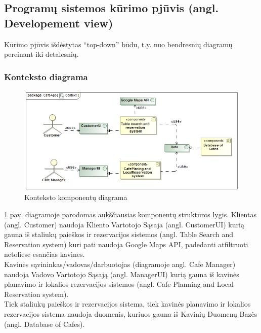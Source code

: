 \documentclass{VUMIFPSkursinis}
\begin{document}
\subsection {Programų sistemos kūrimo pjūvis (angl. Developement view)}
Kūrimo pjūvis išdėstytas “top-down” būdu, t.y. nuo bendresnių
diagramų pereinant iki detalesnių.

\subsubsection{Konteksto diagrama}

\begin {figure}[H]
	\includegraphics[width=\textwidth,height=\textheight,keepaspectratio]{img/Context}
	\caption{Konteksto komponentų diagrama}
	\label{fig:Context}
\end{figure}

\ref {fig:Context} pav. diagramoje parodomas aukščiausias komponentų struktūros lygis. Klientas (angl. Customer) naudoja Kliento Vartotojo Sąsaja (angl. CustomerUI) kurią gauna iš staliukų paieškos ir rezervacijos sistemos (angl. Table Search and Reservation system) kuri pati naudoja Google Maps API, padedanti atfiltruoti netoliese esančias kavines. \\
Kavinės sąvininkas/vadovas/darbuotojas (diagramoje angl. Cafe Manager) naudoja Vadovo Vartotojo Sąsają (angl. ManagerUI) kurią gauna iš kavinės planavimo ir lokalios rezervacijos sistemos (angl. Cafe Planning and Local Reservation system).\\
Tiek staliukų paieškos ir rezervacijos sistema, tiek kavinės planavimo ir lokalios rezervacijos sistema naudoja duomenis, kuriuos gauna iš Kavinių Duomenų Bazės (angl. Database of Cafes).
\end{document}
